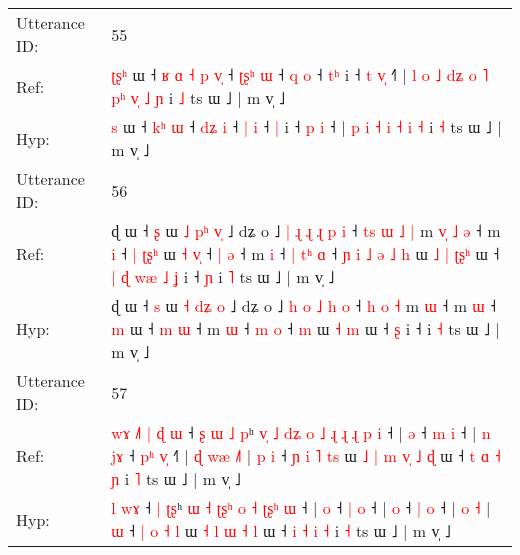\documentclass[10pt]{article}
\DeclareRobustCommand{\hl}[1]{{\textcolor{red}{#1}}}
\begin{document}
\begin{longtable}{ll}
\midrule
Utterance ID: & 55 \\
Ref: & \hl{ʈ}\hl{ʂ}\hl{ʰ} ɯ ˧\hl{ }\hl{ʁ}\hl{ }\hl{ɑ} \hl{˧}\hl{ }\hl{p} \hl{v}\hl{̩} ˧ \hl{ʈ}\hl{ʂ}\hl{ʰ} \hl{ɯ} ˧ \hl{q} \hl{o} ˧ \hl{t}\hl{ʰ} i ˧ \hl{t} \hl{v}\hl{̩} ˧\hl{˥} |\hl{ }\hl{l}\hl{ }\hl{o}\hl{ }\hl{˩} \hl{d}\hl{ʑ} \hl{o} \hl{˥} \hl{p}\hl{ʰ} \hl{v}\hl{̩} \hl{˩} \hl{ɲ} i \hl{˩} ts ɯ ˩ | m v̩ ˩
 \\
Hyp: & \hl{}\hl{}\hl{s} ɯ ˧\hl{}\hl{}\hl{}\hl{} \hl{}\hl{k}\hl{ʰ} \hl{}\hl{ɯ} ˧ \hl{}\hl{d}\hl{ʑ} \hl{i} ˧ \hl{|} \hl{i} ˧ \hl{}\hl{|} i ˧ \hl{p} \hl{}\hl{i} ˧\hl{} |\hl{}\hl{}\hl{}\hl{}\hl{}\hl{} \hl{}\hl{p} \hl{i} \hl{˧} \hl{}\hl{i} \hl{}\hl{˧} \hl{i} \hl{˧} i \hl{˧} ts ɯ ˩ | m v̩ ˩
 \\
\midrule
Utterance ID: & 56 \\
Ref: & ɖ ɯ ˧ \hl{ʂ} ɯ \hl{˩} \hl{p}\hl{ʰ} \hl{v}\hl{̩} ˩ dʑ o ˩\hl{ }\hl{|} \hl{ɻ} \hl{ɻ} \hl{ɻ} \hl{p} \hl{i} ˧\hl{ }\hl{t}\hl{s} \hl{ɯ} \hl{˩} \hl{|} m\hl{ }\hl{v}\hl{̩}\hl{ }\hl{˩} \hl{ə} ˧ m \hl{i} ˧\hl{ }\hl{|} \hl{ʈ}\hl{ʂ}\hl{ʰ} ɯ\hl{ }\hl{˧}\hl{ }\hl{v}\hl{̩} ˧ \hl{|} \hl{ə} ˧ m \hl{i} ˧\hl{ }\hl{|} \hl{t}\hl{ʰ} \hl{ɑ} ˧\hl{ }\hl{ɲ}\hl{ }\hl{i}\hl{ }\hl{˩}\hl{ }\hl{ə}\hl{ }\hl{˩} \hl{h} ɯ\hl{ }\hl{˩} \hl{|} \hl{ʈ}\hl{ʂ}\hl{ʰ} ɯ ˧\hl{ }\hl{|}\hl{ }\hl{ɖ}\hl{ }\hl{w}\hl{æ}\hl{ }\hl{˩} \hl{ʝ} i ˧\hl{ }\hl{ɲ} i \hl{˥} ts ɯ ˩ | m v̩ ˩
 \\
Hyp: & ɖ ɯ ˧ \hl{s} ɯ \hl{˧} \hl{d}\hl{ʑ} \hl{}\hl{o} ˩ dʑ o ˩\hl{}\hl{} \hl{h} \hl{o} \hl{˩} \hl{h} \hl{o} ˧\hl{}\hl{}\hl{} \hl{h} \hl{o} \hl{˧} m\hl{}\hl{}\hl{}\hl{}\hl{} \hl{ɯ} ˧ m \hl{ɯ} ˧\hl{}\hl{} \hl{}\hl{}\hl{m} ɯ\hl{}\hl{}\hl{}\hl{}\hl{} ˧ \hl{m} \hl{ɯ} ˧ m \hl{ɯ} ˧\hl{}\hl{} \hl{}\hl{m} \hl{o} ˧\hl{}\hl{}\hl{}\hl{}\hl{}\hl{}\hl{}\hl{}\hl{}\hl{} \hl{m} ɯ\hl{}\hl{} \hl{˧} \hl{}\hl{}\hl{m} ɯ ˧\hl{}\hl{}\hl{}\hl{}\hl{}\hl{}\hl{}\hl{}\hl{} \hl{ʂ} i ˧\hl{}\hl{} i \hl{˧} ts ɯ ˩ | m v̩ ˩
 \\
\midrule
Utterance ID: & 57 \\
Ref: & \hl{w}\hl{ɤ}\hl{ }\hl{˩}\hl{˥}\hl{ }\hl{|} \hl{ɖ}\hl{ }\hl{ɯ} ˧\hl{ }\hl{ʂ} \hl{ɯ} \hl{˩}\hl{ }\hl{p}ʰ\hl{ }\hl{v}\hl{̩} \hl{˩} \hl{d}\hl{ʑ} \hl{o}\hl{ }\hl{˩} \hl{ɻ} \hl{ɻ} \hl{ɻ}\hl{ }\hl{p} \hl{i} ˧ | \hl{ə} ˧ \hl{m} \hl{i} ˧ |\hl{ }\hl{n} \hl{j}\hl{ɤ} ˧ \hl{p}\hl{ʰ} \hl{v}\hl{̩} ˧\hl{˥} |\hl{ }\hl{ɖ} \hl{w}\hl{æ} \hl{˩}\hl{˥} |\hl{ }\hl{p} \hl{i} ˧ \hl{ɲ} \hl{i} \hl{˥} \hl{t}\hl{s} ɯ\hl{ }\hl{˩} \hl{|} \hl{m} \hl{v}\hl{̩} \hl{˩} \hl{ɖ} ɯ ˧ \hl{t} \hl{ɑ} \hl{˧} \hl{ɲ} i \hl{˥} ts ɯ ˩ | m v̩ ˩
 \\
Hyp: & \hl{}\hl{}\hl{}\hl{}\hl{}\hl{}\hl{l} \hl{}\hl{w}\hl{ɤ} ˧\hl{}\hl{} \hl{|} \hl{}\hl{ʈ}\hl{ʂ}ʰ\hl{}\hl{}\hl{} \hl{ɯ} \hl{}\hl{˧} \hl{ʈ}\hl{ʂ}\hl{ʰ} \hl{o} \hl{˧} \hl{ʈ}\hl{ʂ}\hl{ʰ} \hl{ɯ} ˧ | \hl{o} ˧ \hl{|} \hl{o} ˧ |\hl{}\hl{} \hl{}\hl{o} ˧ \hl{}\hl{|} \hl{}\hl{o} ˧\hl{} |\hl{}\hl{} \hl{}\hl{o} \hl{}\hl{˧} |\hl{}\hl{} \hl{ɯ} ˧ \hl{|} \hl{o} \hl{˧} \hl{}\hl{l} ɯ\hl{}\hl{} \hl{˧} \hl{l} \hl{}\hl{ɯ} \hl{˧} \hl{l} ɯ ˧ \hl{i} \hl{˧} \hl{i} \hl{˧} i \hl{˧} ts ɯ ˩ | m v̩ ˩

\end{longtable}
\end{document}

